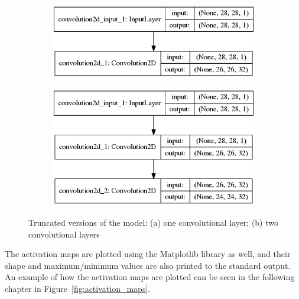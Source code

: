 \begin{figure}
	\begin{subfigure}{0.5\textwidth}
		\centering
		\includegraphics[width=0.9\linewidth]{figures/1stconvarch.png}
		\caption{}
	\end{subfigure}
	\begin{subfigure}{0.5\textwidth}
		\centering
		\includegraphics[width=0.9\linewidth]{figures/2ndconvarch.png}
		\caption{}
	\end{subfigure}
	\caption{Truncated versions of the model: (a) one convolutional layer; (b) two convolutional layers}
	\label{fig:truncated}
\end{figure}

The activation maps are plotted using the Matplotlib library as well, and their shape and maximum/minimum values are also printed to the standard output. An example of how the activation maps are plotted can be seen in the following chapter in Figure~\ref{fig:activation_maps}.
